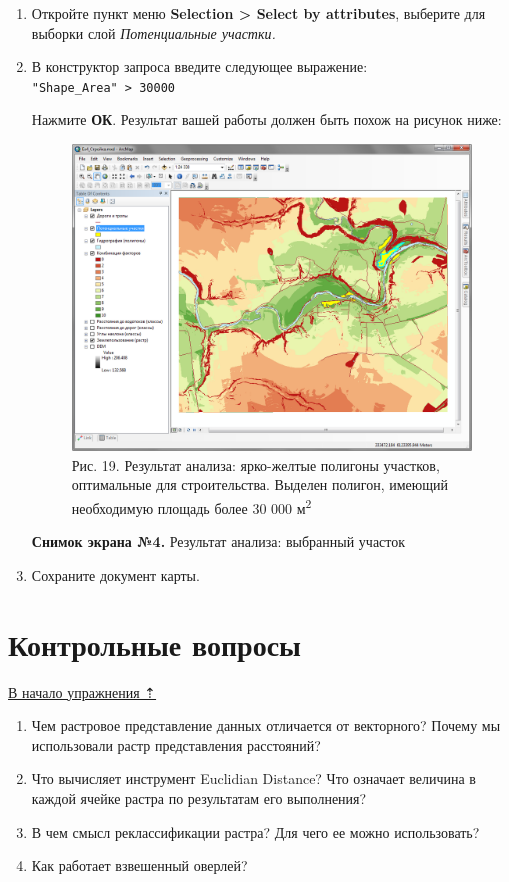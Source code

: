 \documentclass[]{book}
\theoremstyle{definition}
\theoremstyle{definition}
\theoremstyle{definition}
\theoremstyle{remark}
\begin{document}
\begin{enumerate}
\def\labelenumi{\arabic{enumi}.}
\item
  Откройте пункт меню \textbf{Selection \textgreater{} Select by
  attributes}, выберите для выборки слой \emph{Потенциальные участки.}
\item
  В конструктор запроса введите следующее выражение:
  \texttt{"Shape\_Area"\ \textgreater{}\ 30000}

  Нажмите \textbf{ОК}. Результат вашей работы должен быть похож на
  рисунок ниже:

  \begin{figure}
  \centering
  \includegraphics{images/Ex14/image30.png}
  \caption{Рис. 19. Результат анализа: ярко-желтые полигоны участков,
  оптимальные для строительства. Выделен полигон, имеющий необходимую
  площадь более 30 000 м\textsuperscript{2}}
  \end{figure}

  \textbf{Снимок экрана №4.} Результат анализа: выбранный участок
\item
  Сохраните документ карты.
\end{enumerate}

\hypertarget{weighted-overlay-questions}{%
\section{Контрольные вопросы}\label{weighted-overlay-questions}}

\protect\hyperlink{weighted-overlay}{В начало упражнения ⇡}

\begin{enumerate}
\def\labelenumi{\arabic{enumi}.}
\item
  Чем растровое представление данных отличается от векторного? Почему мы
  использовали растр представления расстояний?
\item
  Что вычисляет инструмент Euclidian Distance? Что означает величина в
  каждой ячейке растра по результатам его выполнения?
\item
  В чем смысл реклассификации растра? Для чего ее можно использовать?
\item
  Как работает взвешенный оверлей?
\end{enumerate}
\end{document}
